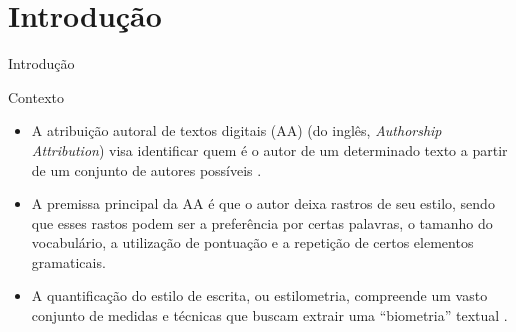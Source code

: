 \section{Introdução}

\begin{frame}{Introdução}
	\begin{alertblock}{Contexto}
		\begin{itemize}\itemsep9pt
		\item A atribuição autoral de textos digitais (AA) (do inglês, {\it Authorship Attribution})  visa identificar quem é o autor de um determinado texto a partir de um conjunto de autores possíveis \cite{Potthast2017}.
		
		\item A premissa principal da AA é que o autor deixa rastros de seu estilo, sendo que esses rastos podem ser a preferência por certas palavras, o tamanho do vocabulário, a utilização de pontuação e a repetição de certos elementos gramaticais.
		
		\item A quantificação do estilo de escrita, ou estilometria, compreende um vasto conjunto de medidas e técnicas que buscam extrair uma ``biometria'' textual \cite{Neal2017}.
		
		\end{itemize}
	
		
	\end{alertblock}

\end{frame}

